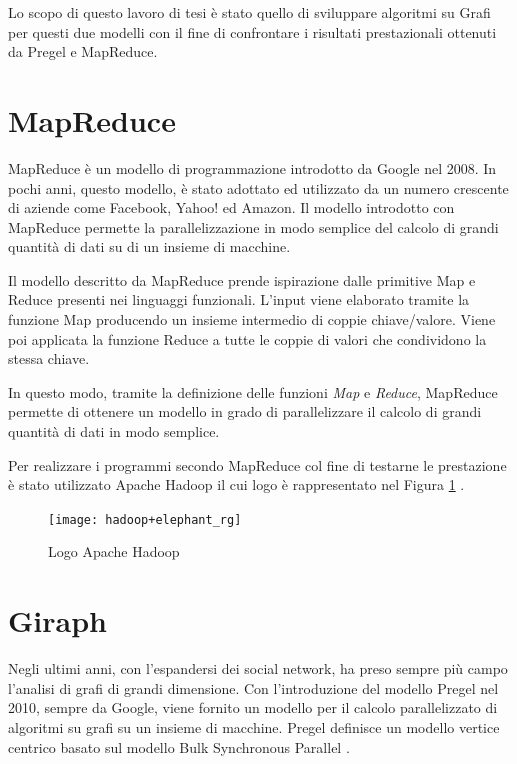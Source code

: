 \documentclass[LaM,binding=0.6cm]{sapthesis}
\begin{document}
Lo scopo di questo lavoro di tesi è stato quello di sviluppare algoritmi su Grafi per questi due modelli con il fine di confrontare i risultati prestazionali ottenuti da Pregel e MapReduce.


\section{MapReduce}

MapReduce \cite{Dean:2008:MSD:1327452.1327492} è un modello di programmazione introdotto da Google nel 2008. In pochi anni, questo modello, è stato adottato ed utilizzato da un numero crescente di aziende come Facebook, Yahoo! ed Amazon. Il modello introdotto con MapReduce permette la parallelizzazione in modo semplice del calcolo di grandi quantità di dati su di un insieme di macchine.

Il modello descritto da MapReduce prende ispirazione dalle primitive Map e Reduce presenti nei linguaggi funzionali.  L'input viene elaborato tramite la funzione Map producendo un insieme intermedio di coppie chiave/valore. Viene poi applicata la funzione Reduce a tutte le coppie di valori che condividono la stessa chiave.



In questo modo, tramite la definizione delle funzioni \textit{Map} e \textit{Reduce}, MapReduce permette di ottenere un modello in grado di parallelizzare il calcolo di grandi quantità di dati in modo semplice.

Per realizzare i programmi secondo MapReduce col fine di testarne le prestazione è stato utilizzato Apache Hadoop \cite{1_hadoop.apache.org_2015} il cui logo è rappresentato nel Figura \ref{fig:HadoopLogo} .

\begin{figure}[h]
\centering
\texttt{[image: hadoop+elephant\_rg]}
\caption{Logo Apache Hadoop}
\label{fig:HadoopLogo}
\end{figure}


\section{Giraph}
Negli ultimi anni, con l'espandersi dei social network, ha preso sempre più campo l'analisi di grafi di grandi dimensione. Con l'introduzione del modello Pregel \cite{Malewicz:2010:PSL:1807167.1807184} nel 2010, sempre da Google, viene fornito un modello per il calcolo parallelizzato di algoritmi su grafi su un insieme di macchine. Pregel definisce un modello vertice centrico basato sul modello Bulk Synchronous Parallel \cite{Valiant:1990:BMP:79173.79181}. 
\end{document}
